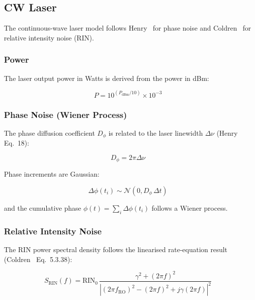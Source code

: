 \documentclass[11pt,a4paper]{article}
\begin{document}
\subsection{CW Laser}

The continuous-wave laser model follows Henry~\cite{henry} for phase noise
and Coldren~\cite{coldren} for relative intensity noise (RIN).

\subsubsection{Power}

The laser output power in Watts is derived from the power in dBm:

\begin{equation}
  P = 10^{(P_{\text{dBm}}/10)} \times 10^{-3}
\end{equation}

\subsubsection{Phase Noise (Wiener Process)}

The phase diffusion coefficient $D_\phi$ is related to the laser linewidth
$\Delta\nu$ (Henry~\cite{henry} Eq.~18):

\begin{equation}
  D_\phi = 2\pi \Delta\nu
\end{equation}

Phase increments are Gaussian:

\begin{equation}
  \Delta\phi(t_i) \sim \mathcal{N}(0, D_\phi \, \Delta t)
\end{equation}

and the cumulative phase $\phi(t) = \sum_{i} \Delta\phi(t_i)$ follows a
Wiener process.

\subsubsection{Relative Intensity Noise}

The RIN power spectral density follows the linearised rate-equation result
(Coldren~\cite{coldren} Eq.~5.3.38):

\begin{equation}
  S_{\text{RIN}}(f) = \text{RIN}_0 \,
  \frac{\gamma^2 + (2\pi f)^2}
       {|(2\pi f_{\text{RO}})^2 - (2\pi f)^2 + j\gamma(2\pi f)|^2}
  \label{eq:rin-psd}
\end{equation}
\end{document}

